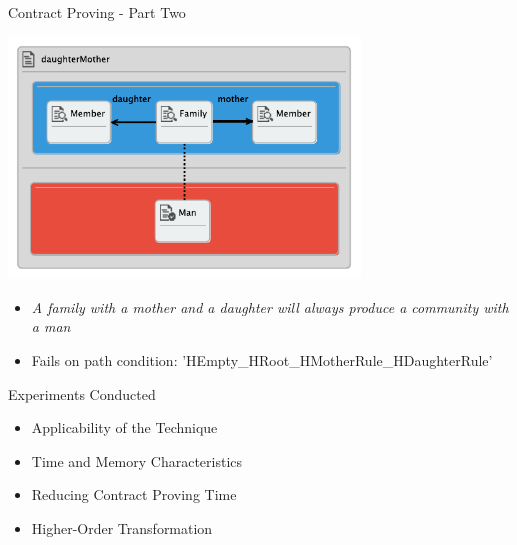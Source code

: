 \documentclass[xcolor=dvipsnames, 12pt]{beamer}
\begin{document}

\begin{frame}{Contract Proving - Part Two}
\begin{center}
\includegraphics[width=0.7\textwidth]{figures/daughterMotherProp}
\end{center}
\begin{itemize}[<+->]
\item \textit{A family with a mother and a daughter will always produce a community with a man}
\item Fails on path condition: 'HEmpty\_HRoot\_HMotherRule\_HDaughterRule'
\end{itemize}
\end{frame}





\begin{frame}{Experiments Conducted}
\begin{itemize}
\item Applicability of the Technique
\item Time and Memory Characteristics
\item Reducing Contract Proving Time
\item Higher-Order Transformation
\end{itemize}
\end{frame}
\end{document}
